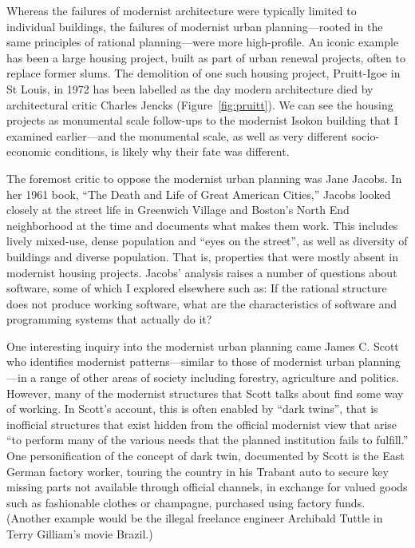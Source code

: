 Whereas the failures of modernist architecture were typically limited to individual buildings,
the failures of modernist urban planning---rooted in the same principles of rational
planning---were more high-profile. An iconic example has been a large housing project,
built as part of urban renewal projects, often to replace former slums. The demolition
of one such housing project, Pruitt-Igoe in St Louis, in 1972 has been labelled as the
day modern architecture died by architectural critic Charles Jencks (Figure~\ref{fig:pruitt}).
We can see the housing projects as monumental scale follow-ups to the modernist Isokon building
that I examined earlier---and the monumental scale, as well as very different socio-economic
conditions, is likely why their fate was different.

The foremost critic to oppose the modernist urban planning was Jane Jacobs. In her 1961 book,
``The Death and Life of Great American Cities,'' Jacobs looked closely at
the street life in Greenwich Village and Boston's North End neighborhood at the time and
documents what makes them work. This includes lively mixed-use, dense population and
``eyes on the street'', as well as diversity of buildings and diverse population. That is,
properties that were mostly absent in modernist housing projects. Jacobs' analysis
raises a number of questions about software, some of which I explored
elsewhere such as:
If the rational structure does not produce working software, what are the characteristics
of software and programming systems that actually do it?

One interesting inquiry into the modernist urban planning came James C. Scott who identifies
modernist patterns---similar to those of modernist urban planning---in a range of other
areas of society including forestry, agriculture and politics. However, many of the modernist
structures that Scott talks about find some way of working. In Scott's account, this is often
enabled by ``dark twins'', that is inofficial structures that exist hidden from the official
modernist view that arise ``to perform many of the various needs that the planned institution
fails to fulfill.'' One personification of the concept of dark twin,
documented by Scott is the East German factory worker, touring the country in his Trabant
auto to secure key missing parts not available through official channels, in exchange for
valued goods such as fashionable clothes or champagne, purchased using factory funds.
(Another example would be the illegal freelance engineer Archibald Tuttle in Terry Gilliam's
movie Brazil.)

